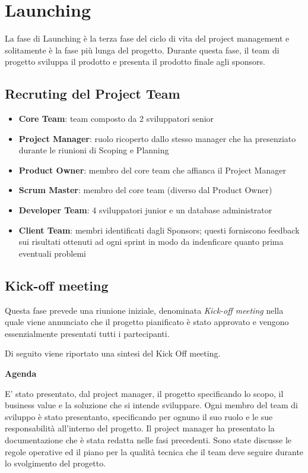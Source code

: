 \chapter{Launching}
La fase di Launching è la terza fase del ciclo di vita del project management 
e solitamente è la fase più lunga del progetto. 
Durante questa fase, il team di progetto sviluppa il prodotto e presenta il prodotto 
finale agli sponsors.


\section{Recruting del Project Team}

\begin{itemize}
    \item \textbf{Core Team}: team composto da 2 sviluppatori senior
    \item \textbf{Project Manager}: ruolo ricoperto dallo stesso manager che ha
    presenziato durante le riunioni di Scoping e Planning
    \item \textbf{Product Owner}: membro del core team che affianca il Project Manager
    \item \textbf{Scrum Master}: membro del core team (diverso dal Product Owner) 
    \item \textbf{Developer Team}: 4 sviluppatori junior e un database administrator
    \item \textbf{Client Team}: membri identificati dagli Sponsors; questi forniscono feedback
    sui risultati ottenuti ad ogni sprint in modo da indenficare quanto prima eventuali problemi
\end{itemize}

\section{Kick-off meeting}
Questa fase prevede una riunione iniziale, denominata \textit{Kick-off meeting} nella
quale viene annunciato che il progetto pianificato è stato approvato e vengono essenzialmente 
presentati tutti i partecipanti.

Di seguito viene riportato una sintesi del Kick Off meeting.

\textbf{Agenda}

E' stato presentato, dal project manager, il progetto specificando lo scopo, il business value e 
la soluzione che si intende sviluppare. Ogni membro del team di sviluppo è stato presentanto, 
specificando per ognuno il suo ruolo e le sue responsabilità all'interno del progetto.
Il project manager ha presentato la documentazione che è stata redatta nelle fasi precedenti.
Sono state discusse le regole operative ed il piano per la qualità tecnica che il team deve seguire 
durante lo svolgimento del progetto.

